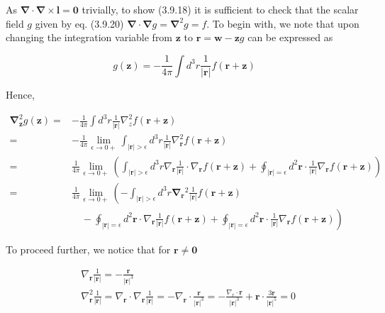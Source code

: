 \documentclass{article}
\begin{document}
As $\boldsymbol{\nabla} \cdot \boldsymbol{\nabla} \times \boldsymbol{l}=\mathbf{0}$ trivially, to show (3.9.18) it is sufficient to check that the scalar field $g$ given by eq. (3.9.20) $\boldsymbol{\nabla} \cdot \boldsymbol{\nabla} g=\boldsymbol{\nabla}^{2} g=f$. To begin with, we note that upon changing the integration variable from $\boldsymbol{z}$ to $\boldsymbol{r}=\boldsymbol{w}-\boldsymbol{z} g$ can be expressed as
 
\begin{equation*}
g(\boldsymbol{z})=-\frac{1}{4 \pi} \int d^{3} r \frac{1}{|\boldsymbol{r}|} f(\boldsymbol{r}+\boldsymbol{z}) \tag{3.9.21}
\end{equation*}
 

Hence,
 
\begin{align*}
\boldsymbol{\nabla}_{\boldsymbol{z}}^{2} g(\boldsymbol{z})= & -\frac{1}{4 \pi} \int d^{3} r \frac{1}{|\boldsymbol{r}|} \nabla_{z}^{2} f(\boldsymbol{r}+\boldsymbol{z})  \tag{3.9.22}\\
= & -\frac{1}{4 \pi} \lim _{\epsilon \rightarrow 0+} \int_{|\boldsymbol{r}|>\epsilon} d^{3} r \frac{1}{|\boldsymbol{r}|} \nabla_{\boldsymbol{r}}^{2} f(\boldsymbol{r}+\boldsymbol{z}) \\
= & \frac{1}{4 \pi} \lim _{\epsilon \rightarrow 0+}\left(\int_{|\boldsymbol{r}|>\epsilon} d^{3} r \nabla_{\boldsymbol{r}} \frac{1}{|\boldsymbol{r}|} \cdot \nabla_{\boldsymbol{r}} f(\boldsymbol{r}+\boldsymbol{z})+\oint_{|\boldsymbol{r}|=\epsilon} d^{2} \boldsymbol{r} \cdot \frac{1}{|\boldsymbol{r}|} \nabla_{\boldsymbol{r}} f(\boldsymbol{r}+\boldsymbol{z})\right) \\
= & \frac{1}{4 \pi} \lim _{\epsilon \rightarrow 0+}\left(-\int_{|\boldsymbol{r}|>\epsilon} d^{3} r \boldsymbol{\nabla}_{\boldsymbol{r}}{ }^{2} \frac{1}{|\boldsymbol{r}|} f(\boldsymbol{r}+\boldsymbol{z})\right. \\
& \left.\quad-\oint_{|\boldsymbol{r}|=\epsilon} d^{2} \boldsymbol{r} \cdot \nabla_{\boldsymbol{r}} \frac{1}{|\boldsymbol{r}|} f(\boldsymbol{r}+\boldsymbol{z})+\oint_{|\boldsymbol{r}|=\epsilon} d^{2} \boldsymbol{r} \cdot \frac{1}{|\boldsymbol{r}|} \nabla_{\boldsymbol{r}} f(\boldsymbol{r}+\boldsymbol{z})\right)
\end{align*}
 

To proceed further, we notice that for $\boldsymbol{r} \neq \mathbf{0}$
 
\begin{align*}
& \nabla_{\boldsymbol{r}} \frac{1}{|\boldsymbol{r}|}=-\frac{\boldsymbol{r}}{|\boldsymbol{r}|^{3}}  \tag{3.9.23}\\
& \nabla_{\boldsymbol{r}}^{2} \frac{1}{|\boldsymbol{r}|}=\nabla_{\boldsymbol{r}} \cdot \nabla_{\boldsymbol{r}} \frac{1}{|\boldsymbol{r}|}=-\nabla_{\boldsymbol{r}} \cdot \frac{\boldsymbol{r}}{|\boldsymbol{r}|^{3}}=-\frac{\nabla_{r} \cdot \boldsymbol{r}}{|\boldsymbol{r}|^{3}}+\boldsymbol{r} \cdot \frac{3 \boldsymbol{r}}{|\boldsymbol{r}|^{5}}=0 \tag{3.9.24}
\end{align*}
 
\end{document}
